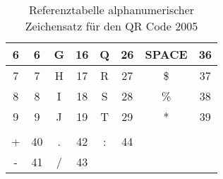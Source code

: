 \begin{appendix}
\begin{table}[htbp]
\begin{tabular}{cccccccc}
			\multicolumn{1}{|c|}{6}                & \multicolumn{1}{c|}{6}             & \multicolumn{1}{c|}{G}                & \multicolumn{1}{c|}{16}            & \multicolumn{1}{c|}{Q}                & \multicolumn{1}{c|}{26}            & \multicolumn{1}{c|}{SPACE}            & \multicolumn{1}{c|}{36}            \\ \hline
			\multicolumn{1}{|c|}{7}                & \multicolumn{1}{c|}{7}             & \multicolumn{1}{c|}{H}                & \multicolumn{1}{c|}{17}            & \multicolumn{1}{c|}{R}                & \multicolumn{1}{c|}{27}            & \multicolumn{1}{c|}{\$}                & \multicolumn{1}{c|}{37}            \\ \hline
			\multicolumn{1}{|c|}{8}                & \multicolumn{1}{c|}{8}             & \multicolumn{1}{c|}{I}                & \multicolumn{1}{c|}{18}            & \multicolumn{1}{c|}{S}                & \multicolumn{1}{c|}{28}            & \multicolumn{1}{c|}{\%}               & \multicolumn{1}{c|}{38}            \\ \hline
			\multicolumn{1}{|c|}{9}                & \multicolumn{1}{c|}{9}             & \multicolumn{1}{c|}{J}                & \multicolumn{1}{c|}{19}            & \multicolumn{1}{c|}{T}                & \multicolumn{1}{c|}{29}            & \multicolumn{1}{c|}{*}                & \multicolumn{1}{c|}{39}            \\ \hline
			&                                    &                                       &                                    &                                       &                                    &                                       &                                    \\ \hline
			\multicolumn{1}{|c|}{+}                & \multicolumn{1}{c|}{40}            & \multicolumn{1}{c|}{.}                & \multicolumn{1}{c|}{42}            & \multicolumn{1}{c|}{:}                & \multicolumn{1}{c|}{44}            & \multicolumn{1}{c|}{}                 & \multicolumn{1}{c|}{}              \\ \hline
			\multicolumn{1}{|c|}{-}                & \multicolumn{1}{c|}{41}            & \multicolumn{1}{c|}{/}                & \multicolumn{1}{c|}{43}            & \multicolumn{1}{c|}{}                 & \multicolumn{1}{c|}{}              & \multicolumn{1}{c|}{}                 & \multicolumn{1}{c|}{}              \\ \hline
		\end{tabular}
		\caption[Referenztabelle alphanumerischer Zeichensatz für den QR Code 2005]{Referenztabelle alphanumerischer Zeichensatz für den QR Code 2005\footnotemark}
		\label{tab:refalphanum}
	\end{table}
	~\pagebreak


\end{appendix}
